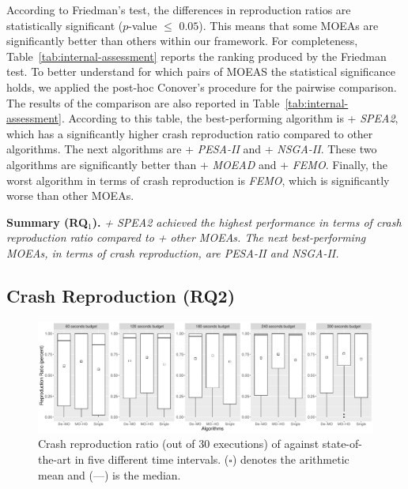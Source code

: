 According to Friedman's test, the differences in reproduction ratios are statistically significant ($p$-value $\leq$ $0.05$).
This means that some MOEAs are significantly better than others within our \moho framework.  For completeness, Table~\ref{tab:internal-assessment} reports the
ranking produced by the Friedman test. To better understand for which
pairs of MOEAS the statistical significance holds, we applied the post-hoc Conover's procedure for the pairwise comparison. The results of the comparison are also reported in Table~\ref{tab:internal-assessment}.
According to this table, the best-performing algorithm is \moho + \textit{SPEA2}, which has a significantly higher crash reproduction ratio compared to other \moho algorithms. The next algorithms are \moho + \textit{PESA-II} and \moho + \textit{NSGA-II}. These two algorithms are significantly better than \moho + \textit{MOEAD} and \moho + \textit{FEMO}. Finally, the worst algorithm in terms of crash reproduction is \textit{FEMO}, which is significantly worse than other MOEAs.


\textbf{Summary (RQ$_1$). } \textit{\moho + \textit{SPEA2} achieved the highest performance in terms of crash reproduction ratio compared to \moho + other MOEAs. 
The next best-performing MOEAs, in terms of crash reproduction, are \textit{PESA-II} and \textit{NSGA-II}.
}

\subsection{Crash Reproduction (RQ2)} 
\label{sec:results:rq2}

\begin{figure}[t]
    \centering
    \includegraphics[width=\linewidth]{papers/moho/figures/rq2-reproduction-overall.pdf}
    \caption{Crash reproduction ratio (out of 30 executions) of \moho against state-of-the-art in five different time intervals.  ($\square$) denotes the arithmetic mean and (---) is the median.}
    \label{fig:eval:reproduction-rq2}
\end{figure}


